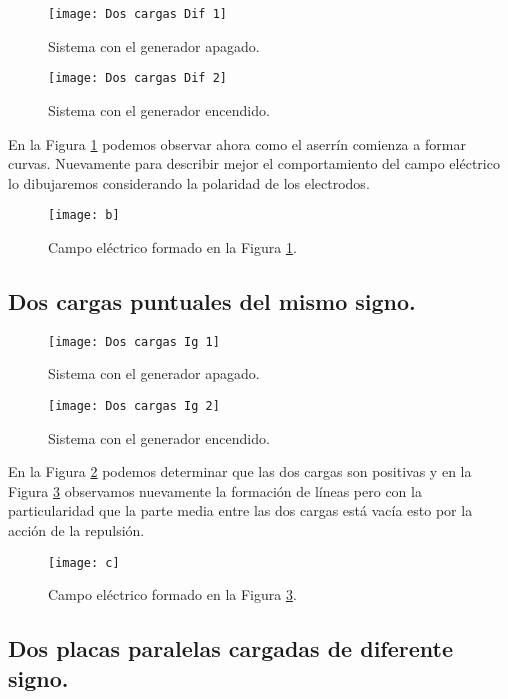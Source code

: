 \documentclass[14pt]{article}
\begin{document}
\begin{figure}[h!]
	\centering
	\texttt{[image: Dos cargas Dif 1]}
	\caption{Sistema con el generador apagado.}
\end{figure}

\begin{figure}[h!]
	\centering
	\texttt{[image: Dos cargas Dif 2]}
	\caption{Sistema con el generador encendido.}
	\label{fig:CDif1}
\end{figure}

En la Figura \ref{fig:CDif1} podemos observar ahora como el aserrín comienza a formar curvas. Nuevamente para describir mejor el comportamiento del campo eléctrico lo dibujaremos considerando la polaridad de los electrodos.

\begin{figure}[h!]
	\centering
	\texttt{[image: b]}
	\caption{Campo eléctrico formado en la Figura \ref{fig:CDif1}.}
	
\end{figure}

\newpage
\subsection{Dos cargas puntuales del mismo signo.}

\begin{figure}[h!]
	\centering
	\texttt{[image: Dos cargas Ig 1]}
	\caption{Sistema con el generador apagado.}
	\label{fig:2CarIA}
\end{figure}

\begin{figure}[h!]
	\centering
	\texttt{[image: Dos cargas Ig 2]}
	\caption{Sistema con el generador encendido.}
	\label{fig:2CarI}
\end{figure}

En la Figura \ref{fig:2CarIA} podemos determinar que las dos cargas son positivas y en la Figura \ref{fig:2CarI} observamos nuevamente la formación de líneas pero con la particularidad que la parte media entre las dos cargas está vacía esto por la acción de la repulsión.

\begin{figure}
	\centering
	\texttt{[image: c]}
	\caption{Campo eléctrico formado en la Figura \ref{fig:2CarI}.}
\end{figure}

\subsection{Dos placas paralelas cargadas de diferente signo.}
\end{document}

